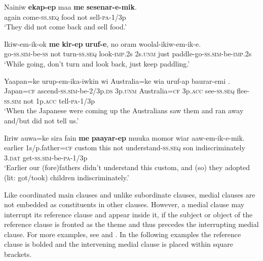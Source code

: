 \ea%
\label{ex:8:x1443}
\gll Nainiw  \textbf{ekap-ep}  maa  \textbf{me} \textbf{sesenar-e-mik}. \\
again  come-\textsc{ss}.\textsc{seq} food  not  sell-\textsc{pa}-1/3p\\
\glt`They did not come back and sell food.'
\z


\ea%
\label{ex:8:x1447}
\gll Ikiw-em-ik-ok  \textbf{me} \textbf{kir-ep} \textbf{uruf-e}, no  oram  woolal-ikiw-em-ik-e.\\
go-\textsc{ss}.\textsc{sim}-be-\textsc{ss} not  turn-\textsc{ss}.\textsc{seq} look-\textsc{imp}.2s 2s.\textsc{unm} just  paddle-go-\textsc{ss}.\textsc{sim}-be-\textsc{imp}.2s\\
\glt`While going, don't turn and look back, just keep paddling.'
\z


\ea%
\label{ex:8:x1446}
\gll Yaapan=ke  urup-em-ika-iwkin  wi  Australia=ke wia  uruf-ap  baurar-emi     .\\
Japan=\textsc{cf} ascend-\textsc{ss}.\textsc{sim}-be-2/3p.\textsc{ds} 3p.\textsc{unm} Australia=\textsc{cf} 3p.\textsc{acc} see-\textsc{ss}.\textsc{seq} flee-\textsc{ss}.\textsc{sim} not 1p.\textsc{acc} tell-\textsc{pa}-1/3p\\
\glt`When the Japanese were coming up the Australians saw them and ran away and/but did not tell us.'
\z


\ea%
\label{ex:8:x1448}
\gll Iiriw  auwa=ke  sira  fain  \textbf{me}  \textbf{paayar-ep} muuka  momor  wiar  aaw-em-ik-e-mik.\\
earlier  1s/p.father=\textsc{cf} custom  this  not  understand-\textsc{ss}.\textsc{seq} son indiscriminately 3.\textsc{dat} get-\textsc{ss}.\textsc{sim}-be-\textsc{pa}-1/3p\\
\glt`Earlier our (fore)fathers didn't understand this custom, and (so) they adopted (lit: got/took) children indiscriminately.'
\z


Like coordinated main clauses and unlike subordinate clauses, medial clauses are not embedded as constituents in other clauses. However, a medial clause may interrupt its reference clause and appear inside it, if the subject or object  of the reference clause is fronted as the theme and thus precedes the interrupting medial clause. For more examples, see  and . In the following examples the reference clause is bolded and the intervening medial clause is placed within square brackets.

